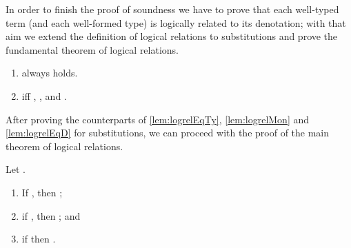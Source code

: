 \documentclass{LMCS}
\newcommand{\LONGVERSION}[1]{}
\newcommand{\SHORTVERSION}[1]{#1}
\newcommand{\LONGSHORT}[2]{\LONGVERSION{#1}\SHORTVERSION{#2}}
\begin{document}
In order to finish the proof of soundness we have to prove that each
well-typed term (and each well-formed type) is logically related to
its denotation; with that aim we extend the definition of logical
relations to substitutions and prove the fundamental theorem of
logical relations.

\begin{defi} \hfill
  \label{logrelsubs}
  \begin{enumerate}[(1)]
  \item  always holds.
  \item  iff
    ,
    , and
    .
  \end{enumerate}
\end{defi}\medskip

\LONGSHORT{

\noindent By the way this relation is defined, the counterparts of
~\ref{lem:logrelEqTy},~\ref{lem:logrelMon}, and~\ref{lem:logrelEqD} are
easily proved by induction on the co-domain of the substitutions.

\begin{rem}
  \label{lem:logrelEqSub}
  If , and , then .
\end{rem}
\begin{rem}
  \label{lem:monsubs}
  If , then
  for any ,
  .
\end{rem}
\begin{rem}
  \label{lem:logrelSubEqD}
  If , and , then .
\end{rem}
}{
  After proving the counterparts of \ref{lem:logrelEqTy},
  \ref{lem:logrelMon} and \ref{lem:logrelEqD} for substitutions, we
  can proceed with the proof of the main theorem of logical relations.
}

\begin{thm}
  \label{thm:logrel}
  Let .
  \begin{enumerate}[\em(1)]
  \item If , then
    ;
  \item if , then
    ; and
  \item if  then
    .
  \end{enumerate}
\end{thm}
\LONGVERSION{
\begin{proof}By mutual induction on the derivations. See \ref{prf:logrel}.
\end{proof}
}
\end{document}

